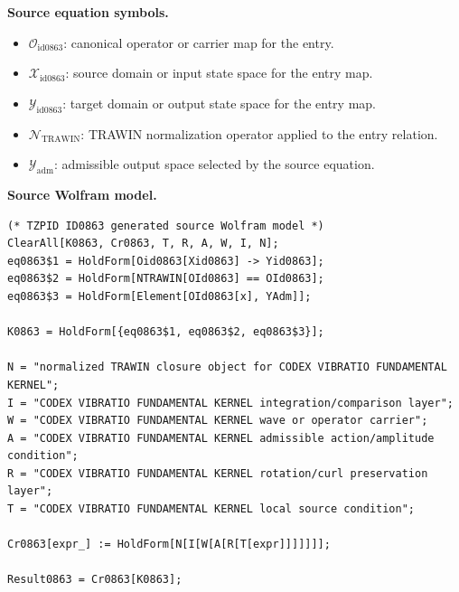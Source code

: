 \begin{minipage}[t]{0.49\linewidth}
\begingroup
\small
\raggedright
\textbf{Source equation symbols.}\par
\begin{itemize}[leftmargin=1.35em,itemsep=1pt,topsep=1pt,parsep=0pt]
    \item $\mathcal{O}_{\mathrm{id0863}}$: canonical operator or carrier map for the entry.
    \item $\mathcal{X}_{\mathrm{id0863}}$: source domain or input state space for the entry map.
    \item $\mathcal{Y}_{\mathrm{id0863}}$: target domain or output state space for the entry map.
    \item $\mathcal{N}_{\mathrm{TRAWIN}}$: TRAWIN normalization operator applied to the entry relation.
    \item $\mathcal{Y}_{\mathrm{adm}}$: admissible output space selected by the source equation.
\end{itemize}
\endgroup
\end{minipage}\hfill
\begin{minipage}[t]{0.47\linewidth}
\begingroup
\scriptsize
\raggedright
\textbf{Source Wolfram model.}\par
\begin{Verbatim}[fontsize=\tiny,breaklines=true,breakanywhere=true]
(* TZPID ID0863 generated source Wolfram model *)
ClearAll[K0863, Cr0863, T, R, A, W, I, N];
eq0863$1 = HoldForm[Oid0863[Xid0863] -> Yid0863];
eq0863$2 = HoldForm[NTRAWIN[OId0863] == OId0863];
eq0863$3 = HoldForm[Element[OId0863[x], YAdm]];

K0863 = HoldForm[{eq0863$1, eq0863$2, eq0863$3}];

N = "normalized TRAWIN closure object for CODEX VIBRATIO FUNDAMENTAL KERNEL";
I = "CODEX VIBRATIO FUNDAMENTAL KERNEL integration/comparison layer";
W = "CODEX VIBRATIO FUNDAMENTAL KERNEL wave or operator carrier";
A = "CODEX VIBRATIO FUNDAMENTAL KERNEL admissible action/amplitude condition";
R = "CODEX VIBRATIO FUNDAMENTAL KERNEL rotation/curl preservation layer";
T = "CODEX VIBRATIO FUNDAMENTAL KERNEL local source condition";

Cr0863[expr_] := HoldForm[N[I[W[A[R[T[expr]]]]]]];

Result0863 = Cr0863[K0863];
\end{Verbatim}
\endgroup
\end{minipage}

